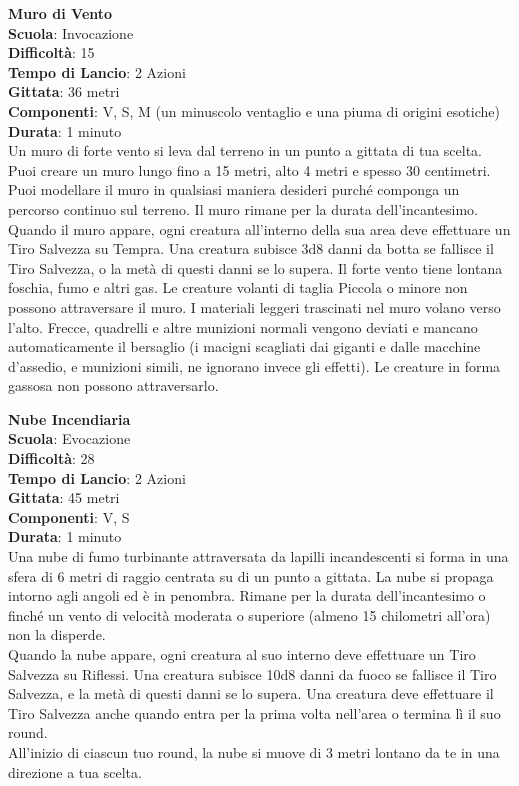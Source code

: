 \begin{multicols}{2}
\medskip\textbf{Muro di Vento}\\
\textbf{Scuola}: Invocazione\\
\textbf{Difficoltà}: 15\\
\textbf{Tempo di Lancio}: 2 Azioni\\
\textbf{Gittata}: 36 metri\\
\textbf{Componenti}: V, S, M (un minuscolo ventaglio e una piuma di origini esotiche)\\
\textbf{Durata}: 1 minuto\\
Un muro di forte vento si leva dal terreno in un punto a gittata di tua scelta. Puoi creare un muro lungo fino a 15 metri, alto 4 metri e spesso 30 centimetri. Puoi modellare il muro in qualsiasi maniera desideri purché componga un percorso continuo sul terreno. Il muro rimane per la durata dell'incantesimo. Quando il muro appare, ogni creatura all'interno della sua area deve effettuare un Tiro Salvezza su Tempra. Una creatura subisce 3d8 danni da botta se fallisce il Tiro Salvezza, o la metà di questi danni se lo supera. Il forte vento tiene lontana foschia, fumo e altri gas. Le creature volanti di taglia Piccola o minore non possono attraversare il muro. I materiali leggeri trascinati nel muro volano verso l'alto. Frecce, quadrelli e altre munizioni normali vengono deviati e mancano automaticamente il bersaglio (i macigni scagliati dai giganti e dalle macchine d'assedio, e munizioni simili, ne ignorano invece gli effetti). Le creature in forma gassosa non possono attraversarlo.

\medskip\textbf{Nube Incendiaria}\\
\textbf{Scuola}: Evocazione\\
\textbf{Difficoltà}: 28\\
\textbf{Tempo di Lancio}: 2 Azioni\\
\textbf{Gittata}: 45 metri\\
\textbf{Componenti}: V, S\\
\textbf{Durata}: 1 minuto\\
Una nube di fumo turbinante attraversata da lapilli incandescenti si forma in una sfera di 6 metri di raggio centrata su di un punto a gittata. La nube si propaga intorno agli angoli ed è in penombra. Rimane per la durata dell'incantesimo o finché un vento di velocità moderata o superiore (almeno 15 chilometri all'ora) non la disperde.\\
Quando la nube appare, ogni creatura al suo interno deve effettuare un Tiro Salvezza su Riflessi. Una creatura subisce 10d8 danni da fuoco se fallisce il Tiro Salvezza, e la metà di questi danni se lo supera. Una creatura deve effettuare il Tiro Salvezza anche quando entra per la prima volta nell'area o termina lì il suo round.\\
All'inizio di ciascun tuo round, la nube si muove di 3 metri lontano da te in una direzione a tua scelta. \\


\end{multicols}
